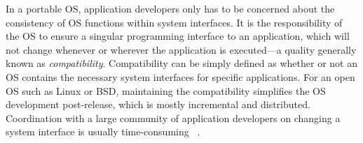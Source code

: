 In a portable OS, application developers only has to be concerned about
the consistency of OS functions within
system interfaces. %
It is the responsibility of the OS to ensure a singular programming interface to an application,
which will not change whenever or wherever
the application is executed---a quality generally known as
{\em compatibility}.
Compatibility can be simply defined as whether or not an OS contains the necessary system interfaces for specific applications.
For an open OS such as Linux or BSD, maintaining the compatibility simplifies
the OS development post-release,
which is mostly incremental and distributed.
Coordination with a large community of application developers on changing a system interface is usually time-consuming
~\cite{corbet15syscall2038}.
